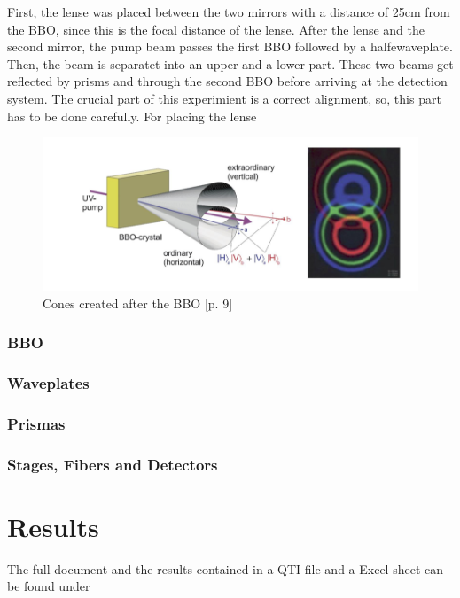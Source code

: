 \documentclass[12pt,a4paper]{article}
\begin{document}
\begin{multicols}{2}
First, the lense was placed between the two mirrors with a distance of 25cm from the BBO, since this is the focal distance of the lense. After the lense and the second mirror, the pump beam passes the first BBO followed by a halfewaveplate. Then, the beam is separatet into an upper and a lower part. These two beams get reflected by prisms and through the second BBO before arriving at the detection system.
The crucial part of this experimient is a correct alignment, so, this part has to be done carefully. 
For placing the lense
\begin{figure}[H]
 \centering
 \includegraphics[scale=0.7]{./figures/cones.png}
 \caption{Cones created after the BBO \cite{physikwiki}[p. 9]}
 \label{fig:cones}
\end{figure}

\subsubsection{BBO}
\subsubsection{Waveplates}
\subsubsection{Prismas}
\subsubsection{Stages, Fibers and Detectors}

\section{Results}
The full document and the results contained in a QTI file and a Excel sheet can be found under \cite{github}

\end{multicols}
\end{document}
